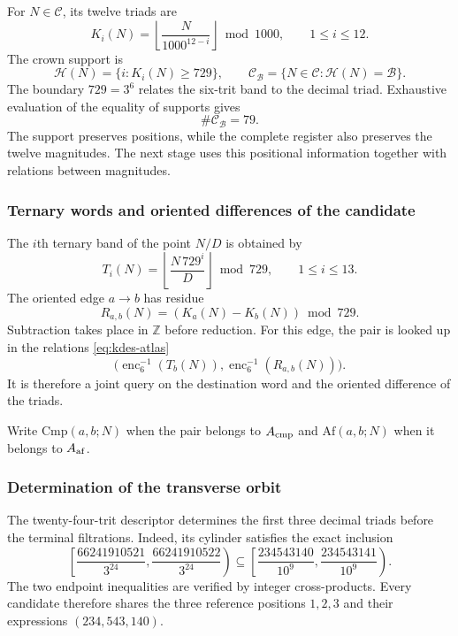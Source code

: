 For $N\in\mathcal C$, its twelve triads are
\begin{equation}
 K_i(N)=\left\lfloor\frac{N}{1000^{12-i}}\right\rfloor\bmod1000,
 \qquad1\leq i\leq12.
 \label{eq:kdes-triadas}
\end{equation}
The crown support is
\[
 \mathcal H(N)=\{i:K_i(N)\geq729\},
 \qquad
 \mathcal C_{\mathcal B}=\{N\in\mathcal C:\mathcal H(N)=\mathcal B\}.
\]
The boundary $729=3^6$ relates the six-trit band to the decimal
triad. Exhaustive evaluation of the equality of supports gives
\begin{equation}
 \#\mathcal C_{\mathcal B}=79.
 \label{eq:kdes-79}
\end{equation}
The support preserves positions, while the complete register
also preserves the twelve magnitudes. The next stage uses this
positional information together with relations between magnitudes.

\subsubsection{Ternary words and oriented differences of the candidate}

The $i$th ternary band of the point $N/D$ is obtained by
\begin{equation}
 T_i(N)=\left\lfloor\frac{N\,729^i}{D}\right\rfloor\bmod729,
 \qquad1\leq i\leq13.
 \label{eq:kdes-tercandidato}
\end{equation}
The oriented edge $a\to b$ has residue
\begin{equation}
 R_{a,b}(N)=(K_a(N)-K_b(N))\bmod729.
 \label{eq:kdes-resarista}
\end{equation}
Subtraction takes place in $\mathbb Z$ before reduction. For this edge, the pair is looked up in the relations \eqref{eq:kdes-atlas}
\[
 \bigl(\operatorname{enc}_6^{-1}(T_b(N)),
  \operatorname{enc}_6^{-1}(R_{a,b}(N))\bigr).
\]
It is therefore a joint query on the destination word and the oriented difference of the triads.

Write $\mathrm{Cmp}(a,b;N)$ when the pair belongs to
$\mathcal A_{\rm cmp}$ and $\mathrm{Af}(a,b;N)$ when it belongs to
$\mathcal A_{\rm af}$.

\subsubsection{Determination of the transverse orbit}

The twenty-four-trit descriptor determines the first three
decimal triads before the terminal filtrations. Indeed, its
cylinder satisfies the exact inclusion
\[
 \left[\frac{66241910521}{3^{24}},
       \frac{66241910522}{3^{24}}\right)
 \subseteq
 \left[\frac{234543140}{10^9},
       \frac{234543141}{10^9}\right).
\]
The two endpoint inequalities are verified by integer cross-products. Every candidate therefore shares the three reference positions $1,2,3$ and their expressions $(234,543,140)$.

